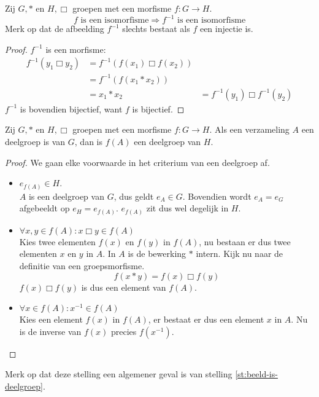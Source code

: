 \documentclass[main.tex]{subfiles}
\begin{document}
\begin{st}
  Zij $G,*$ en $H,\Box$ groepen met een morfisme $f: G \rightarrow H$.
  \[ f \text{ is een isomorfisme} \Rightarrow f^{-1} \text{ is een isomorfisme} \]
  Merk op dat de afbeelding $f^{-1}$ slechts bestaat als $f$ een injectie is.
  \begin{proof}
    $f^{-1}$ is een morfisme:
    \[ 
    \begin{array}{rll}
      f^{-1}(y_{1} \Box y_{2}) &= f^{-1}(f(x_{1}) \Box f(x_{2})) &\\
                             &= f^{-1}(f(x_{1} * x_{2})) &\\
                             &= x_{1} * x_{2} &= f^{-1}(y_{1}) \Box f^{-1}(y_{2})
    \end{array}
    \]
    $f^{-1}$ is bovendien bijectief, want $f$ is bijectief.
  \end{proof}
\end{st}

\begin{st}
  \label{st:fa-deelgroep-h}
  Zij $G,*$ en $H,\Box$ groepen met een morfisme $f: G \rightarrow H$.
  Als een verzameling $A$ een deelgroep is van $G$, dan is $f(A)$ een deelgroep van $H$.

  \begin{proof}
    We gaan elke voorwaarde in het criterium van een deelgroep af.
    \begin{itemize}
    \item $e_{f(A)} \in H$.\\
      $A$ is een deelgroep van $G$, dus geldt $e_{A}\in G$.
      Bovendien wordt $e_{A} = e_{G}$ afgebeeldt op $e_{H} = e_{f(A)}$.
      $e_{f(A)}$ zit dus wel degelijk in $H$.
    \item $\forall x,y \in f(A): x \Box y \in f(A)$\\
      Kies twee elementen $f(x)$ en $f(y)$ in $f(A)$, nu bestaan er dus twee elementen $x$ en $y$ in $A$.
      In $A$ is de bewerking $*$ intern.
      Kijk nu naar de definitie van een groepsmorfisme.
      \[ f(x * y) = f(x) \Box f(y) \]
      $f(x) \Box f(y)$ is dus een element van $f(A)$.
    \item $\forall x \in f(A): x^{-1} \in f(A)$\\
      Kies een element $f(x)$ in $f(A)$, er bestaat er dus een element $x$ in $A$.
      Nu is de inverse van $f(x)$ precies $f(x^{-1})$.
    \end{itemize}
  \end{proof}
  Merk op dat deze stelling een algemener geval is van stelling \ref{st:beeld-is-deelgroep}.
\end{st}
\end{document}
